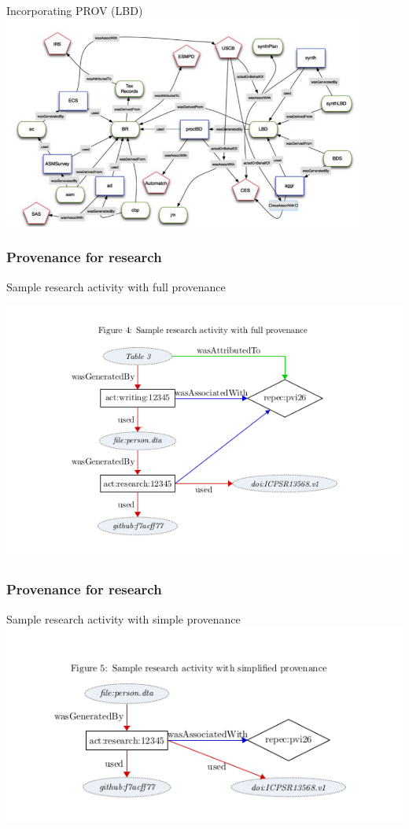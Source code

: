 \begin{frame}{Incorporating PROV (LBD)}
	\includegraphics[width=0.9\textwidth]{LBD_Prov_simplified.png}
\end{frame}


\begin{frame}
	\frametitle{Provenance for research}
	\begin{block}{Sample research activity with full provenance}

	\includegraphics[scale=0.5]{tikz-authorship-example}
	\end{block}
\end{frame}


\begin{frame}
	\frametitle{Provenance for research}
	\begin{block}{Sample research activity with simple provenance}
		\centering
		\includegraphics[scale=0.5]{tikz-authorship-example-simple}
	\end{block}
\end{frame}

